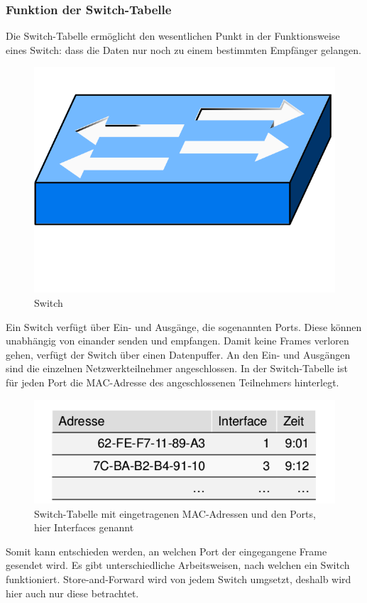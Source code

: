 \subsubsection{Funktion der Switch-Tabelle}
Die Switch-Tabelle ermöglicht den wesentlichen Punkt in der Funktionsweise eines Switch: dass die Daten nur noch zu einem bestimmten Empfänger gelangen. \cite[Kapitel 5]{netzwerkeI}
\begin{figure}[H]
	\centering
	\includegraphics[width=0.3\linewidth]{images/switch.png}
	\caption{Switch \cite{switch-bild}}
\end{figure}
Ein Switch verfügt über Ein- und Ausgänge, die sogenannten Ports. Diese können unabhängig von einander senden und empfangen. Damit keine Frames verloren gehen, verfügt der Switch über einen Datenpuffer.
An den Ein- und Ausgängen sind die einzelnen Netzwerkteilnehmer angeschlossen. In der Switch-Tabelle ist für jeden Port die MAC-Adresse des angeschlossenen Teilnehmers hinterlegt.
\begin{figure}[H]
	\centering
	\includegraphics[width=0.7\linewidth]{images/switch-tabelle.png}
	\caption{Switch-Tabelle mit eingetragenen MAC-Adressen und den Ports, hier Interfaces genannt \cite[Kapitel 5, Abbildung Folie 39]{netzwerkeI}}
\end{figure}
Somit kann entschieden werden, an welchen Port der eingegangene Frame gesendet wird.
Es gibt unterschiedliche Arbeitsweisen, nach welchen ein Switch funktioniert. Store-and-Forward wird von jedem Switch umgsetzt, deshalb wird hier auch nur diese betrachtet.


